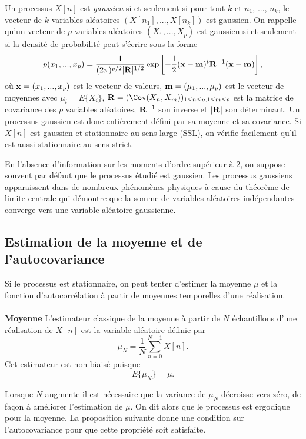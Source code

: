 Un processus $X[n]$ est 
{\it gaussien} si et seulement si pour tout
$k$ et $n_1$, ..., $n_k$, le vecteur de $k$ variables 
al\'eatoires
$(X[{n_1}], ... , X[{n_k}])$ est gaussien.
On rappelle \cite{neveu} qu'un
vecteur de $p$ variables al\'eatoires $(X_1, ... ,X_p )$
est gaussien si et seulement
si la densit\'e de probabilit\'e peut s'\'ecrire sous la forme
\[
p(x_1 , ... , x_p ) = \frac 1 {(2 \pi)^{p/2} |{\bf R}|^{1/2}}
\exp\left[ -\frac 1 2 ( {\bf x} - {\bf m})^t \rm {\bf R}^{-1} 
({\bf x} - {\bf m})\right] ,
\]
o\`u ${\bf x} = (x_1 , ... , x_p )$ est le vecteur de valeurs,
${\bf m} = (\mu_1 , ... , \mu_p )$ est le vecteur de moyennes avec
$\mu_i = E\{X_i\}$,
${\bf R}= ( \Cov ( X_n, X_m ))_{1 \leq n \leq p ,1 \leq m \leq p }$
est la matrice de covariance des $p$ variables al\'eatoires,
${\bf R}^{-1}$ son inverse
et $|{\bf R}|$ son d\'eterminant. 
Un processus gaussien est donc
enti\`erement d\'efini par sa moyenne et sa covariance.
Si $X[n]$ est gaussien et stationnaire au sens large (SSL),
on v\'erifie facilement qu'il est aussi stationnaire au sens 
strict. 

En l'absence d'information sur les moments d'ordre
sup\'erieur \`a 2, on suppose souvent par d\'efaut que le processus
\'etudi\'e est gaussien. Les processus gaussiens
apparaissent dans de nombreux ph\'enom\`enes physiques 
\`a cause du th\'eor\`eme de limite centrale 
\cite{neveu} qui d\'emontre
que la somme de variables al\'eatoires ind\'ependantes 
converge vers une variable al\'eatoire gaussienne.

\subsection {Estimation de la moyenne et de l'autocovariance}
\label{est-moy}

Si le processus est stationnaire, on peut tenter d'estimer 
la moyenne $\mu$ et la fonction 
d'autocorr\'elation \`a partir de moyennes temporelles
d'une r\'ealisation.
\\
\\
{\bf Moyenne}
L'estimateur classique
de la moyenne \`a partir de $N$ \'echantillons
d'une r\'ealisation de $X[n]$ est la variable al\'eatoire 
d\'efinie par
\[
 \mu_N = \frac 1 N \sum_{n=0}^{N-1} X[n] .
\]
Cet estimateur est non biais\'e puisque
\[
E\{ \mu_N\} = \mu .
\]

Lorsque $N$ augmente il est n\'ecessaire que la variance de
$ \mu_N$ d\'ecroisse vers z\'ero,
de fa\c{c}on \`a am\'eliorer l'estimation de $\mu$.
On dit alors que le processus est ergodique pour la moyenne.
La proposition suivante donne une condition sur l'autocovariance
pour que cette propri\'et\'e soit satisfaite.


